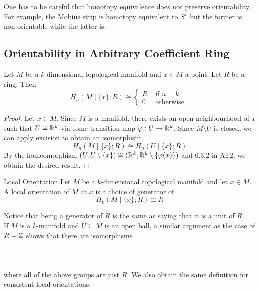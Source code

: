 \documentclass[a4paper]{article}
\begin{document}
One has to be careful that homotopy equivalence does not preserve orientability. For example, the Mobius strip is homotopy equivalent to $S^1$ but the former is non-orientable while the latter is. 

\subsection{Orientability in Arbitrary Coefficient Ring}
\begin{prp}{}{} Let $M$ be a $k$-dimensional topological manifold and $x\in M$ a point. Let $R$ be a ring. Then $$H_n(M\;|\;\{x\};R)\cong\begin{cases}
R & \text{ if } n=k\\
0 & \text{ otherwise }
\end{cases}$$ \tcbline
\begin{proof}
Let $x\in M$. Since $M$ is a manifold, there exists an open neighbourhood of $x$ such that $U\cong\mathbb{R}^k$ via some transition map $\varphi:U\to\mathbb{R}^k$. Since $M\setminus U$ is closed, we can apply excision to obtain an isomorphism $$H_n(M\;|\;\{x\};R)\cong H_n(U\;|\;\{x\};R)$$ By the homeomorphism $(U,U\setminus\{x\})\cong(\mathbb{R}^k,\mathbb{R}^k\setminus\{\varphi(x)\})$ and 6.3.2 in AT2, we obtain the desired result. 
\end{proof}
\end{prp}

\begin{defn}{Local Orientation}{} Let $M$ be a $k$-dimensional topological manifold and let $x\in M$. A local orientation of $M$ at $x$ is a choice of generator of $$H_k(M\;|\;\{x\};R)\cong R$$
\end{defn}

Notice that being a generator of $R$ is the same as saying that it is a unit of $R$. \\

If $M$ is a $k$-manifold and $U\subseteq M$ is an open ball, a similar argument as the case of $R=\mathbb{Z}$ shows that there are isomorphisms \\~\\
\\~\\
where all of the above groups are just $R$. We also obtain the same definition for consistent local orientations. 
\end{document}
